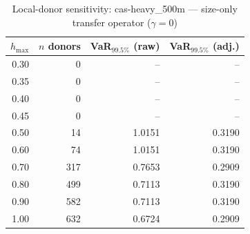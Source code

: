 \begin{table}[htbp]
\centering
\caption{Local-donor sensitivity: cas-heavy_500m --- size-only transfer operator ($\gamma=0$)}
\label{tab:local_donor_cas-heavy_500m}
\begin{tabular}{rrrr}
\toprule
\textbf{$h_{\max}$} & \textbf{$n$ donors} & \textbf{VaR$_{99.5\%}$ (raw)} & \textbf{VaR$_{99.5\%}$ (adj.)} \\
\midrule
0.30 & 0 & -- & -- \\
0.35 & 0 & -- & -- \\
0.40 & 0 & -- & -- \\
0.45 & 0 & -- & -- \\
0.50 & 14 & 1.0151 & 0.3190 \\
0.60 & 74 & 1.0151 & 0.3190 \\
0.70 & 317 & 0.7653 & 0.2909 \\
0.80 & 499 & 0.7113 & 0.3190 \\
0.90 & 582 & 0.7113 & 0.3190 \\
1.00 & 632 & 0.6724 & 0.2909 \\
\bottomrule
\end{tabular}
\end{table}
